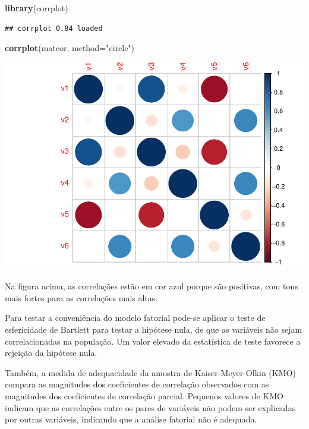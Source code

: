 \documentclass[12pt,brazil,]{book}
\newenvironment{Shaded}{\begin{snugshade}}{\end{snugshade}}
\newcommand{\DataTypeTok}[1]{\textcolor[rgb]{0.13,0.29,0.53}{#1}}
\newcommand{\KeywordTok}[1]{\textcolor[rgb]{0.13,0.29,0.53}{\textbf{#1}}}
\newcommand{\NormalTok}[1]{#1}
\newcommand{\StringTok}[1]{\textcolor[rgb]{0.31,0.60,0.02}{#1}}
\begin{document}
\begin{Shaded}
\begin{Highlighting}[]
\KeywordTok{library}\NormalTok{(corrplot)}
\end{Highlighting}
\end{Shaded}

\begin{verbatim}
## corrplot 0.84 loaded
\end{verbatim}

\begin{Shaded}
\begin{Highlighting}[]
\KeywordTok{corrplot}\NormalTok{(matcor, }\DataTypeTok{method=}\StringTok{"circle"}\NormalTok{)}
\end{Highlighting}
\end{Shaded}

\includegraphics{03-AnaliseFat_files/figure-latex/unnamed-chunk-3-1.pdf}

Na figura acima, as correlações estão em cor azul porque são positivas,
com tons mais fortes para as correlações mais altas.

Para testar a conveniência do modelo fatorial pode-se aplicar o teste de
esfericidade de Bartlett para testar a hipótese nula, de que as
variáveis não sejam correlacionadas na população. Um valor elevado da
estatística de teste favorece a rejeição da hipótese nula.

Também, a medida de adequacidade da amostra de Kaiser-Meyer-Olkin (KMO)
compara as magnitudes dos coeficientes de correlação observados com as
magnitudes dos coeficientes de correlação parcial. Pequenos valores de
KMO indicam que as correlações entre os pares de variáveis não podem ser
explicadas por outras variáveis, indicando que a análise fatorial não é
adequada.
\end{document}
